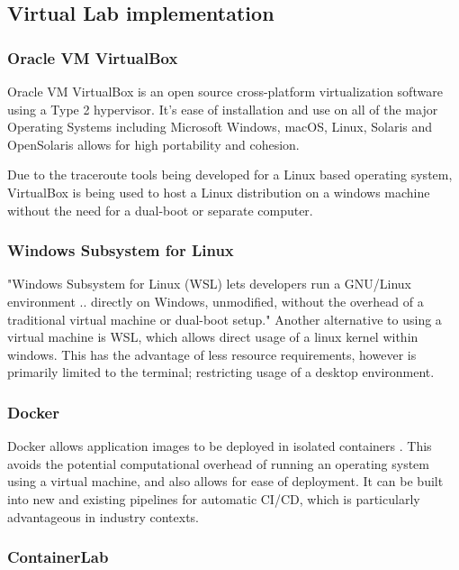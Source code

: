 \subsection{Virtual Lab implementation}

\subsubsection{Oracle VM VirtualBox}
Oracle VM VirtualBox is an open source cross-platform virtualization software using a Type 2 hypervisor. \cite{VirtualWare} It's ease of installation and use on all of the major Operating Systems including Microsoft Windows, macOS, Linux, Solaris and OpenSolaris \cite{oracleVM} allows for high portability and cohesion. 

Due to the traceroute tools being developed for a Linux based operating system, VirtualBox is being used to host a Linux distribution on a windows machine without the need for a dual-boot or separate computer.

\subsubsection{Windows Subsystem for Linux}
"Windows Subsystem for Linux (WSL) lets developers run a GNU/Linux environment .. directly on Windows, unmodified, without the overhead of a traditional virtual machine or dual-boot setup." \cite{wsl} Another alternative to using a virtual machine is WSL, which allows direct usage of a linux kernel within windows. This has the advantage of less resource requirements, however is primarily limited to the terminal; restricting usage of a desktop environment. 

\subsubsection{Docker}
Docker allows application images to be deployed in isolated containers \cite{docker_isolate}. This avoids the potential computational overhead of running an operating system using a virtual machine, and also allows for ease of deployment. It can be built into new and existing pipelines for automatic CI/CD, which is particularly advantageous in industry contexts. 

\subsubsection{ContainerLab}

